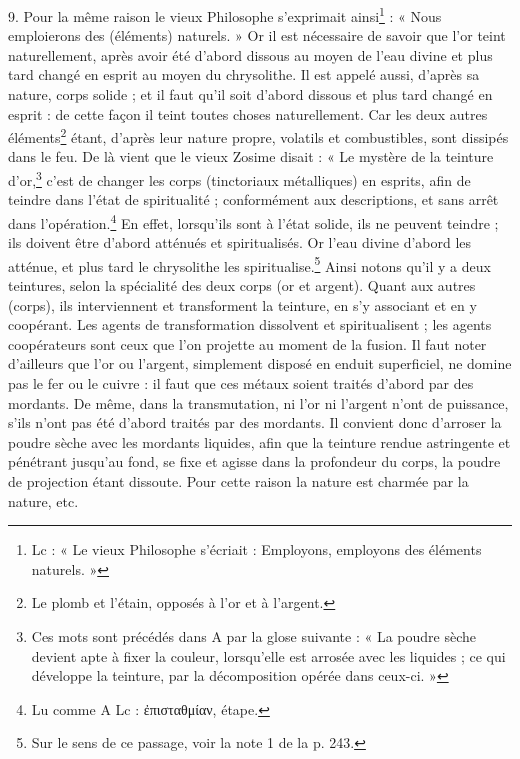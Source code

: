 \documentclass[a4paper, 11pt, oneside, polutonikogreek, french]{article}
\begin{document}
9. Pour la même raison le vieux Philosophe s'exprimait ainsi\footnote{Lc : « Le vieux Philosophe s'écriait : Employons, employons des éléments naturels. »} : « Nous emploierons des (éléments) naturels. » Or il est nécessaire de savoir que l'or teint naturellement, après avoir été d'abord dissous au moyen de l'eau divine et plus tard changé en esprit au moyen du chrysolithe. Il est appelé aussi, d'après sa nature, corps solide ; et il faut qu'il soit d'abord dissous et plus tard changé en esprit : de cette façon il teint toutes choses naturellement. Car les deux autres éléments\footnote{Le plomb et l'étain, opposés à l'or et à l'argent.} étant, d'après leur nature propre, volatils et combustibles, sont dissipés dans le feu. De là vient que le vieux Zosime disait : « Le mystère de la teinture d'or,\footnote{Ces mots sont précédés dans A par la glose suivante : « La poudre sèche devient apte à fixer la couleur, lorsqu'elle est arrosée avec les liquides ; ce qui développe la teinture, par la décomposition opérée dans ceux-ci. »} c'est de changer les corps (tinctoriaux métalliques) en esprits, afin de teindre dans l'état de spiritualité ; conformément aux descriptions, et sans arrêt dans l'opération.\footnote{Lu comme A Lc : ἐπισταθμίαν, étape.} En effet, lorsqu'ils sont à l'état solide, ils ne peuvent teindre ; ils doivent être d'abord atténués et spiritualisés. Or l'eau divine d'abord les atténue, et plus tard le chrysolithe les spiritualise.\footnote{Sur le sens de ce passage, voir la note 1 de la p. 243.} Ainsi notons qu'il y a deux teintures, selon la spécialité des deux corps (or et argent). Quant aux autres (corps), ils interviennent et transforment la teinture, en s'y associant et en y coopérant. Les agents de transformation dissolvent et spiritualisent ; les agents coopérateurs sont ceux que l'on projette au moment de la fusion. Il faut noter d'ailleurs que l'or ou l'argent, simplement disposé en enduit superficiel, ne domine pas le fer ou le cuivre : il faut que ces métaux soient traités d'abord par des mordants. De même, dans la transmutation, ni l'or ni l'argent n'ont de puissance, s'ils n'ont pas été d'abord traités par des mordants. Il convient donc d'arroser la poudre sèche avec les mordants liquides, afin que la teinture rendue astringente et pénétrant jusqu'au fond, se fixe et agisse dans la profondeur du corps, la poudre de projection étant dissoute. Pour cette raison la nature est charmée par la nature, etc.
\end{document}
